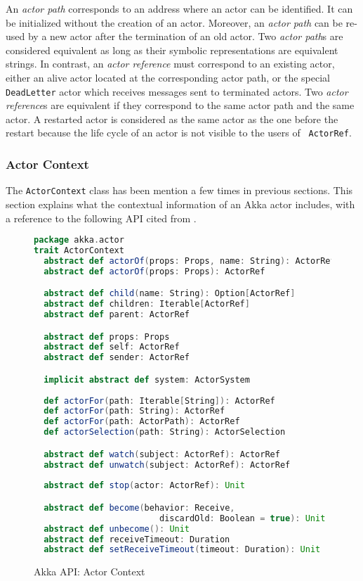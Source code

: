 An {\it actor path} corresponds to an address where an actor can be identified. 
It can be initialized without the creation of an actor.  Moreover, an {\it 
actor path} can be re-used by a new actor after the termination of an old 
actor.  Two {\it actor path}s are considered equivalent as long as their 
symbolic representations are equivalent strings.  In contrast, an {\it 
actor reference} must correspond to an existing actor, either an alive actor 
located at the corresponding actor path, or the special {\tt DeadLetter} actor 
which receives messages sent to terminated actors.  Two {\it actor reference}s 
are equivalent if they correspond to the same actor path and the same actor.  A 
restarted actor is considered as the same actor as the one before the restart 
because the life cycle of an actor is not visible to the users of {\tt 
ActorRef}.


\subsubsection{Actor Context}
\label{akka_actor_context}

The {\tt ActorContext} class has been mention a few times in previous 
sections.  This section explains what the contextual information of an Akka 
actor includes, with a reference to the following API cited from 
\citep{akka_api}.


\begin{figure}[h]
\begin{lstlisting}[language=scala]
package akka.actor
trait ActorContext
  abstract def actorOf(props: Props, name: String): ActorRef
  abstract def actorOf(props: Props): ActorRef

  abstract def child(name: String): Option[ActorRef]
  abstract def children: Iterable[ActorRef]
  abstract def parent: ActorRef

  abstract def props: Props
  abstract def self: ActorRef
  abstract def sender: ActorRef

  implicit abstract def system: ActorSystem
  
  def actorFor(path: Iterable[String]): ActorRef
  def actorFor(path: String): ActorRef
  def actorFor(path: ActorPath): ActorRef
  def actorSelection(path: String): ActorSelection 

  abstract def watch(subject: ActorRef): ActorRef
  abstract def unwatch(subject: ActorRef): ActorRef
      
  abstract def stop(actor: ActorRef): Unit

  abstract def become(behavior: Receive, 
                         discardOld: Boolean = true): Unit
  abstract def unbecome(): Unit
  abstract def receiveTimeout: Duration
  abstract def setReceiveTimeout(timeout: Duration): Unit 
\end{lstlisting}
\caption{Akka API: Actor Context}
\label{akka_actor_context_api}
\end{figure}

